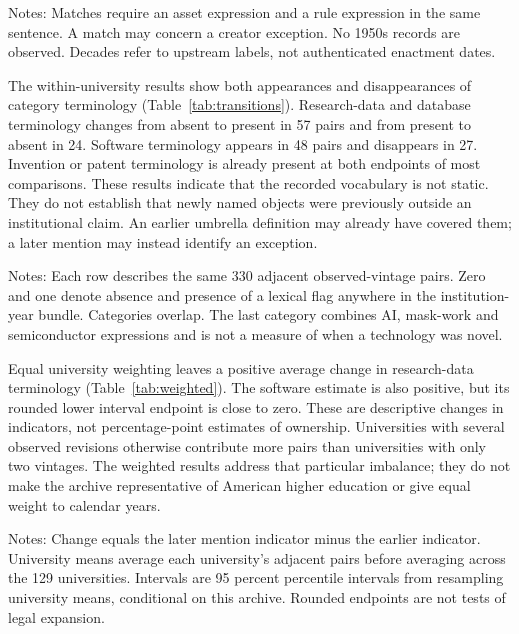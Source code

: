 \documentclass[12pt]{article}
\begin{document}
\begin{table}[htbp]
\centering\caption{Original screening results by decade}\label{tab:decades}
\small
\par\smallskip\footnotesize\raggedright Notes: Matches require an asset expression and a rule expression in the same sentence. A match may concern a creator exception. No 1950s records are observed. Decades refer to upstream labels, not authenticated enactment dates.
\end{table}

The within-university results show both appearances and disappearances of category terminology (Table~\ref{tab:transitions}). Research-data and database terminology changes from absent to present in 57 pairs and from present to absent in 24. Software terminology appears in 48 pairs and disappears in 27. Invention or patent terminology is already present at both endpoints of most comparisons. These results indicate that the recorded vocabulary is not static. They do not establish that newly named objects were previously outside an institutional claim. An earlier umbrella definition may already have covered them; a later mention may instead identify an exception.

\begin{table}[htbp]
\centering\caption{Within-university transitions in category mentions}\label{tab:transitions}
\small
\par\smallskip\footnotesize\raggedright Notes: Each row describes the same 330 adjacent observed-vintage pairs. Zero and one denote absence and presence of a lexical flag anywhere in the institution-year bundle. Categories overlap. The last category combines AI, mask-work and semiconductor expressions and is not a measure of when a technology was novel.
\end{table}

Equal university weighting leaves a positive average change in research-data terminology (Table~\ref{tab:weighted}). The software estimate is also positive, but its rounded lower interval endpoint is close to zero. These are descriptive changes in indicators, not percentage-point estimates of ownership. Universities with several observed revisions otherwise contribute more pairs than universities with only two vintages. The weighted results address that particular imbalance; they do not make the archive representative of American higher education or give equal weight to calendar years.

\begin{table}[htbp]
\centering\caption{Average lexical change under alternative weighting}\label{tab:weighted}
\small
\par\smallskip\footnotesize\raggedright Notes: Change equals the later mention indicator minus the earlier indicator. University means average each university's adjacent pairs before averaging across the 129 universities. Intervals are 95 percent percentile intervals from resampling university means, conditional on this archive. Rounded endpoints are not tests of legal expansion.
\end{table}
\end{document}
